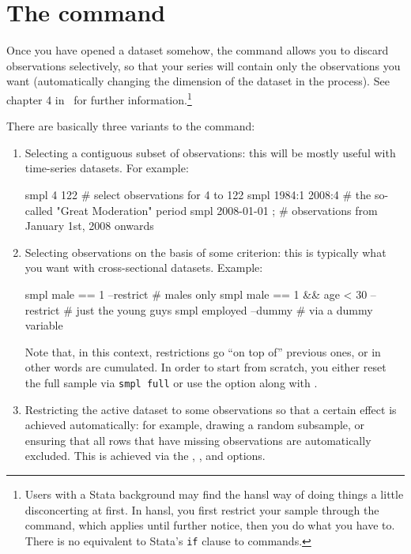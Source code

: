 \section{The  command}

Once you have opened a dataset somehow, the  command allows
you to discard observations selectively, so that your series will
contain only the observations you want (automatically changing the
dimension of the dataset in the process). See chapter 4 in \GUG\ for
further information.\footnote{Users with a Stata background may find
  the hansl way of doing things a little disconcerting at first. In
  hansl, you first restrict your sample through the 
  command, which applies until further notice, then you do what you
  have to. There is no equivalent to Stata's \texttt{if} clause to
  commands.}

There are basically three variants to the  command:
\begin{enumerate}
\item Selecting a contiguous subset of observations: this will be
  mostly useful with time-series datasets. For example:
  \begin{code}
    smpl 4 122            # select observations for 4 to 122
    smpl 1984:1 2008:4    # the so-called "Great Moderation" period
    smpl 2008-01-01 ;     # observations from January 1st, 2008 onwards
  \end{code}
\item Selecting observations on the basis of some criterion: this is
  typically what you want with cross-sectional datasets. Example:
  \begin{code}
    smpl male == 1 --restrict                # males only
    smpl male == 1 && age < 30 --restrict    # just the young guys
    smpl employed --dummy                    # via a dummy variable
  \end{code}
  Note that, in this context, restrictions go ``on top of'' previous
  ones, or in other words are cumulated. In order to start from
  scratch, you either reset the full sample via \texttt{smpl full} or
  use the  option along with .
\item Restricting the active dataset to some observations so that a
  certain effect is achieved automatically: for example, drawing a
  random subsample, or ensuring that all rows that have missing
  observations are automatically excluded. This is achieved via the
  , , and 
  options.
\end{enumerate}

